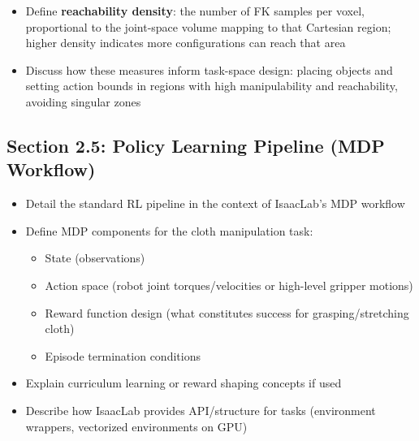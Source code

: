 \begin{itemize}
    \item Define \textbf{reachability density}: the number of FK samples per voxel, proportional to the joint-space volume mapping to that Cartesian region; higher density indicates more configurations can reach that area
    \item Discuss how these measures inform task-space design: placing objects and setting action bounds in regions with high manipulability and reachability, avoiding singular zones
\end{itemize}

\subsection{Section 2.5: Policy Learning Pipeline (MDP Workflow)}
\begin{itemize}
    \item Detail the standard RL pipeline in the context of IsaacLab's MDP workflow
    \item Define MDP components for the cloth manipulation task:
    \begin{itemize}
        \item State (observations)
        \item Action space (robot joint torques/velocities or high-level gripper motions)
        \item Reward function design (what constitutes success for grasping/stretching cloth)
        \item Episode termination conditions
    \end{itemize}
    \item Explain curriculum learning or reward shaping concepts if used
    \item Describe how IsaacLab provides API/structure for tasks (environment wrappers, vectorized environments on GPU)
\end{itemize}

